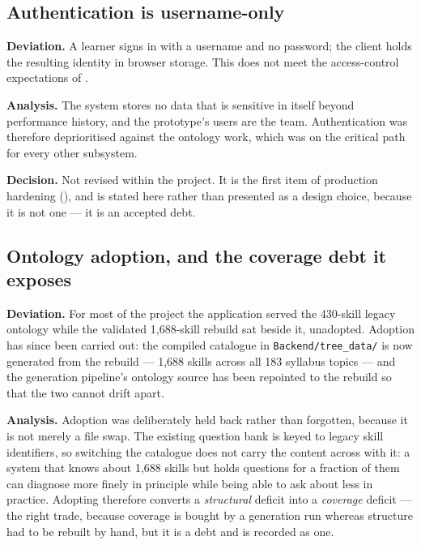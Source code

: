 \subsection{Authentication is username-only}
\label{sec:deviations-auth}

\textbf{Deviation.} A learner signs in with a username and no password; the
client holds the resulting identity in browser storage. This does not meet the
access-control expectations of .

\textbf{Analysis.} The system stores no data that is sensitive in itself beyond
performance history, and the prototype's users are the team. Authentication was
therefore deprioritised against the ontology work, which was on the critical
path for every other subsystem.

\textbf{Decision.} Not revised within the project. It is the first item of
production hardening (), and is stated here rather than
presented as a design choice, because it is not one --- it is an accepted debt.

\subsection{Ontology adoption, and the coverage debt it exposes}
\label{sec:deviations-adoption}

\textbf{Deviation.} For most of the project the application served the 430-skill
legacy ontology while the validated 1{,}688-skill rebuild sat beside it,
unadopted. Adoption has since been carried out: the compiled catalogue in
\texttt{Backend/tree\_data/} is now generated from the rebuild --- 1{,}688
skills across all 183 syllabus topics --- and the generation pipeline's ontology
source has been repointed to the rebuild so that the two cannot drift apart.

\textbf{Analysis.} Adoption was deliberately held back rather than forgotten,
because it is not merely a file swap. The existing question bank is keyed to
legacy skill identifiers, so switching the catalogue does not carry the content
across with it: a system that knows about 1{,}688 skills but holds questions for
a fraction of them can diagnose more finely in principle while being able to ask
about less in practice. Adopting therefore converts a \emph{structural} deficit
into a \emph{coverage} deficit --- the right trade, because coverage is bought
by a generation run whereas structure had to be rebuilt by hand, but it is a
debt and is recorded as one.

